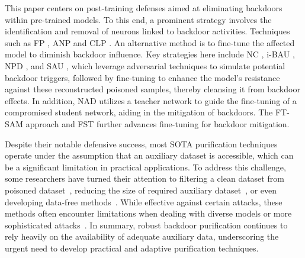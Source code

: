 This paper centers on post-training defenses aimed at eliminating backdoors within pre-trained models. To this end, a prominent strategy involves the identification and removal of neurons linked to backdoor activities. Techniques such as FP \cite{liu2018fine}, ANP \cite{wu2021adversarial} and CLP \cite{zheng2022data}. An alternative method is to fine-tune the affected model to diminish backdoor influence. Key strategies here include NC \cite{wang2019neural}, i-BAU \cite{zeng2022adversarial}, NPD \cite{zhu2023neural}, and SAU \cite{wei2024shared}, which leverage adversarial techniques to simulate potential backdoor triggers, followed by fine-tuning to enhance the model's resistance against these reconstructed poisoned samples, thereby cleansing it from backdoor effects. In addition, NAD \cite{li2021neural}  utilizes a teacher network to guide the fine-tuning of a compromised student network, aiding in the mitigation of backdoors. The FT-SAM approach \cite{Zhu_2023_ICCV} and FST \cite{min2024towards} further advances fine-tuning  for backdoor mitigation.

Despite their notable defensive success, most SOTA purification techniques operate under the assumption that an auxiliary dataset is accessible, which can be a significant limitation in practical applications. To address this challenge, some researchers have turned their attention to filtering a clean dataset from poisoned dataset~\cite{zeng2022sift}, reducing the size of required auxiliary dataset~\cite{chai2022oneshot,li2023reconstructive, Zhu_2023_ICCV}, or even developing data-free methods~\cite{zheng2022data,hong2023revisiting}. While effective against certain attacks, these methods often encounter limitations when dealing with diverse models or more sophisticated attacks~\cite{dunnett2024countering,wu2024backdoorbench}. In summary, robust backdoor purification continues to rely heavily on the availability of adequate auxiliary data, underscoring the urgent need to develop practical and adaptive purification techniques.


